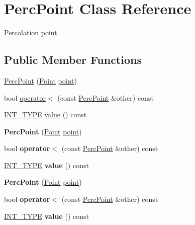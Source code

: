 \hypertarget{class_perc_point}{
\section{PercPoint Class Reference}
\label{class_perc_point}
}
Percolation point.  


\subsection*{Public Member Functions}
\begin{CompactItemize}
\item 
\hyperlink{class_perc_point_52b0b83113727e5d43ac0d3db3125ad0}{PercPoint} (\hyperlink{class_point}{Point} \hyperlink{class_perc_point_6f5497e144144fa0f0e5e4783ab30761}{point})
\item 
bool \hyperlink{class_perc_point_f798aa389b770208bd172542267ec811}{operator$<$} (const \hyperlink{class_perc_point}{PercPoint} \&other) const 
\item 
\hyperlink{cowichan_8hpp_c96945095fd0ce7186a1d00a89f77d2c}{INT\_\-TYPE} \hyperlink{class_perc_point_0099784a4e3728c1f28b546a5b94104a}{value} () const 
\item 
\hypertarget{class_perc_point_52b0b83113727e5d43ac0d3db3125ad0}{
\textbf{PercPoint} (\hyperlink{class_point}{Point} \hyperlink{class_perc_point_6f5497e144144fa0f0e5e4783ab30761}{point})}
\label{class_perc_point_52b0b83113727e5d43ac0d3db3125ad0}

\item 
\hypertarget{class_perc_point_f798aa389b770208bd172542267ec811}{
bool \textbf{operator$<$} (const \hyperlink{class_perc_point}{PercPoint} \&other) const }
\label{class_perc_point_f798aa389b770208bd172542267ec811}

\item 
\hypertarget{class_perc_point_0099784a4e3728c1f28b546a5b94104a}{
\hyperlink{cowichan_8hpp_c96945095fd0ce7186a1d00a89f77d2c}{INT\_\-TYPE} \textbf{value} () const }
\label{class_perc_point_0099784a4e3728c1f28b546a5b94104a}

\item 
\hypertarget{class_perc_point_52b0b83113727e5d43ac0d3db3125ad0}{
\textbf{PercPoint} (\hyperlink{class_point}{Point} \hyperlink{class_perc_point_6f5497e144144fa0f0e5e4783ab30761}{point})}
\label{class_perc_point_52b0b83113727e5d43ac0d3db3125ad0}

\item 
\hypertarget{class_perc_point_f798aa389b770208bd172542267ec811}{
bool \textbf{operator$<$} (const \hyperlink{class_perc_point}{PercPoint} \&other) const }
\label{class_perc_point_f798aa389b770208bd172542267ec811}

\item 
\hypertarget{class_perc_point_0099784a4e3728c1f28b546a5b94104a}{
\hyperlink{cowichan_8hpp_c96945095fd0ce7186a1d00a89f77d2c}{INT\_\-TYPE} \textbf{value} () const }
\label{class_perc_point_0099784a4e3728c1f28b546a5b94104a}

\end{CompactItemize}
